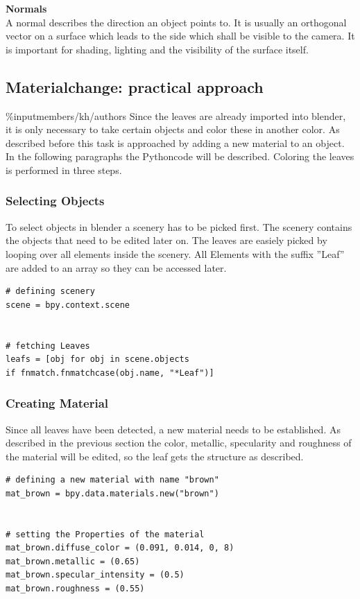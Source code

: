 \textbf{Normals} \\
A normal describes the direction an object points to. It is usually an orthogonal vector on a surface which leads to the side which shall be visible to the camera. It is important for shading, lighting  and the visibility of the surface itself.\\

\subsection{Materialchange: practical approach}
\%input{members/kh/authors}
Since the leaves are already imported into blender, it is only necessary to take certain objects and color these in another color. As described before this task is approached by adding a new material to an object. In the following paragraphs the Pythoncode will be described. \newline
Coloring the leaves is performed in three steps.


\subsubsection{Selecting Objects}
To select objects in blender a scenery has to be picked first. The scenery contains the objects that need to be edited later on. The leaves are easiely picked by looping over all elements inside the scenery. All Elements with the suffix ''Leaf'' are added to an array so they can be accessed later.
\lstset{language=Python, frame=single}
\begin{lstlisting}
# defining scenery
scene = bpy.context.scene


# fetching Leaves
leafs = [obj for obj in scene.objects
if fnmatch.fnmatchcase(obj.name, "*Leaf")]
\end{lstlisting}

\subsubsection{Creating Material}
Since all leaves have been detected, a new material needs to be established. As described in the previous section the color, metallic, specularity and roughness of the material will be edited, so the leaf gets the structure as described.
\lstset{language=Python, frame=single}
\begin{lstlisting}
# defining a new material with name "brown"
mat_brown = bpy.data.materials.new("brown")


# setting the Properties of the material
mat_brown.diffuse_color = (0.091, 0.014, 0, 8)
mat_brown.metallic = (0.65)
mat_brown.specular_intensity = (0.5)
mat_brown.roughness = (0.55)
\end{lstlisting}

